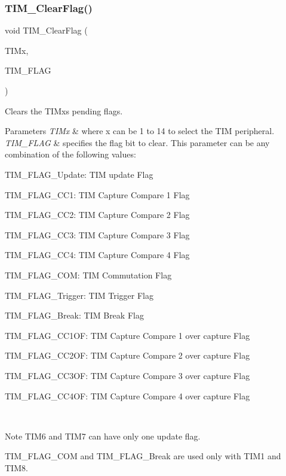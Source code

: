\subsubsection{\texorpdfstring{T\+I\+M\+\_\+\+Clear\+Flag()}{TIM\_ClearFlag()}}
{\footnotesize\ttfamily void T\+I\+M\+\_\+\+Clear\+Flag (\begin{DoxyParamCaption}\item[{\hyperlink{struct_t_i_m___type_def}{T\+I\+M\+\_\+\+Type\+Def} $\ast$}]{T\+I\+Mx,  }\item[{uint16\+\_\+t}]{T\+I\+M\+\_\+\+F\+L\+AG }\end{DoxyParamCaption})}



Clears the T\+I\+Mx\textquotesingle{}s pending flags. 


\begin{DoxyParams}{Parameters}
{\em T\+I\+Mx} & where x can be 1 to 14 to select the T\+IM peripheral. \\
\hline
{\em T\+I\+M\+\_\+\+F\+L\+AG} & specifies the flag bit to clear. This parameter can be any combination of the following values\+: \begin{DoxyItemize}
\item T\+I\+M\+\_\+\+F\+L\+A\+G\+\_\+\+Update\+: T\+IM update Flag \item T\+I\+M\+\_\+\+F\+L\+A\+G\+\_\+\+C\+C1\+: T\+IM Capture Compare 1 Flag \item T\+I\+M\+\_\+\+F\+L\+A\+G\+\_\+\+C\+C2\+: T\+IM Capture Compare 2 Flag \item T\+I\+M\+\_\+\+F\+L\+A\+G\+\_\+\+C\+C3\+: T\+IM Capture Compare 3 Flag \item T\+I\+M\+\_\+\+F\+L\+A\+G\+\_\+\+C\+C4\+: T\+IM Capture Compare 4 Flag \item T\+I\+M\+\_\+\+F\+L\+A\+G\+\_\+\+C\+OM\+: T\+IM Commutation Flag \item T\+I\+M\+\_\+\+F\+L\+A\+G\+\_\+\+Trigger\+: T\+IM Trigger Flag \item T\+I\+M\+\_\+\+F\+L\+A\+G\+\_\+\+Break\+: T\+IM Break Flag \item T\+I\+M\+\_\+\+F\+L\+A\+G\+\_\+\+C\+C1\+OF\+: T\+IM Capture Compare 1 over capture Flag \item T\+I\+M\+\_\+\+F\+L\+A\+G\+\_\+\+C\+C2\+OF\+: T\+IM Capture Compare 2 over capture Flag \item T\+I\+M\+\_\+\+F\+L\+A\+G\+\_\+\+C\+C3\+OF\+: T\+IM Capture Compare 3 over capture Flag \item T\+I\+M\+\_\+\+F\+L\+A\+G\+\_\+\+C\+C4\+OF\+: T\+IM Capture Compare 4 over capture Flag\end{DoxyItemize}
\\
\hline
\end{DoxyParams}
\begin{DoxyNote}{Note}
T\+I\+M6 and T\+I\+M7 can have only one update flag. 

T\+I\+M\+\_\+\+F\+L\+A\+G\+\_\+\+C\+OM and T\+I\+M\+\_\+\+F\+L\+A\+G\+\_\+\+Break are used only with T\+I\+M1 and T\+I\+M8.
\end{DoxyNote}

